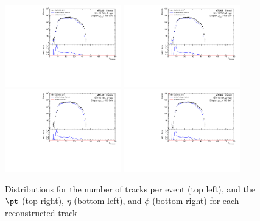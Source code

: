 \begin{figure}[h!]
  \centering
  \includegraphics[page=84,width=0.45\textwidth]{figures/ZjetOmnifoldMCDataComp.pdf}
  \includegraphics[page=86,width=0.45\textwidth]{figures/ZjetOmnifoldMCDataComp.pdf} \\
  \includegraphics[page=87,width=0.45\textwidth]{figures/ZjetOmnifoldMCDataComp.pdf}
  \includegraphics[page=88,width=0.45\textwidth]{figures/ZjetOmnifoldMCDataComp.pdf}
  \caption{Distributions for the number of tracks per event (top left), and the $\pt$ (top right), $\eta$ (bottom left), and $\phi$ (bottom right) for each reconstructed track}
  \label{fig:trackInfo}
\end{figure}
